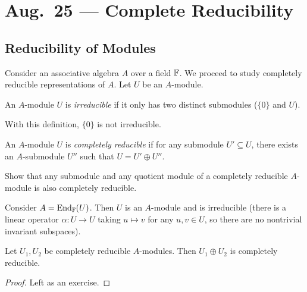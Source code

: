 \chapter{Aug.~25 --- Complete Reducibility}

\section{Reducibility of Modules}

\begin{remark}
  Consider an associative algebra
  $A$ over a field $\mathbb{F}$. We proceed
  to study completely reducible
  representations of $A$.
  Let $U$ be an $A$-module.
\end{remark}

\begin{definition}
  An $A$-module $U$ is \emph{irreducible}
  if it only has two distinct submodules
  ($\{0\}$ and $U$).
\end{definition}

\begin{remark}
  With this definition, $\{0\}$ is
  not irreducible.
\end{remark}

\begin{definition}
  An $A$-module $U$ is \emph{completely reducible}
  if for any submodule $U' \subseteq U$,
  there exists an $A$-submodule
  $U''$ such that $U = U' \oplus U''$.
\end{definition}

\begin{exercise}
  Show that any submodule and any quotient
  module of a completely reducible
  $A$-module is also completely reducible.
\end{exercise}

\begin{example}
  Consider $A = \operatorname{End}_{\mathbb{F}}(U)$. Then $U$ is
  an $A$-module and is irreducible
  (there is a linear operator
  $\alpha : U \to U$ taking
  $u \mapsto v$ for any $u, v \in U$, so
  there are no nontrivial invariant
  subspaces).
\end{example}

\begin{prop}
  Let $U_1, U_2$ be completely reducible
  $A$-modules. Then $U_1 \oplus U_2$ is
  completely reducible.
\end{prop}

\begin{proof}
  Left as an exercise.
\end{proof}

